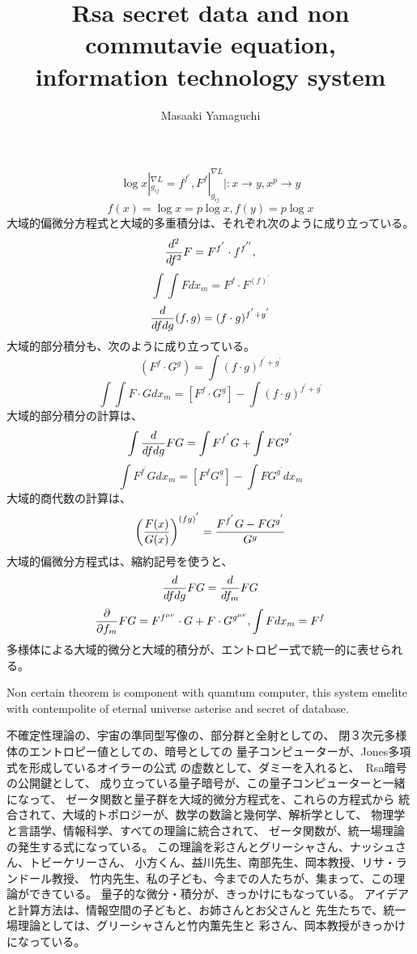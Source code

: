 \documentclass{jsarticle}
\begin{document}
{  $$ \log x|_{g_{ij}}^{\nabla L} = f^{f^{'}}, F^f|_{g_{ij}}^{\nabla L}
  |: x \to y, x^p \to y $$ 
  $$  f(x) = \log x = p \log x, f(y) = p \log x  $$
  大域的偏微分方程式と大域的多重積分は、それぞれ次のように成り立っている。
  $$ {d^2 \over df^2}F = F^{f^{'}}\cdot f^{f^{''}},  $$
  $$ \int \int F dx_m = F^f \cdot F^{(f)^{'}} $$
  $$ {d \over df dg}(f,g) = (f \cdot g)^{f^{'} + g^{'}} $$
  大域的部分積分も、次のように成り立っている。
  $$ (F^f \cdot G^g) = \int (f \cdot g)^{f^{'} + g^{'}} $$
  $$ \int \int F\cdot G dx_m = [F^f \cdot G^g] - 
  \int (f \cdot g)^{f^{'} + g^{'}} $$
  大域的部分積分の計算は、
  $$ \int {d \over {df dg}}FG = \int F^{f^{'}}G + \int F G^{g^{'}} $$
  $$ \int F^{f^{'}}Gdx_m = [F^f G^g] - \int F G^{g^{'}}dx_m$$
  大域的商代数の計算は、
  $$ \left({F(x) \over G(x)}\right)^{(fg)^{'}} = {F^{f^{'}}G - FG^{g^{'}}
  \over G^{g}} $$
  大域的偏微分方程式は、縮約記号を使うと、
  $$ {d \over df dg}FG = {d \over df_m}FG $$
  $$ {\partial \over \partial f_m}FG = F^{f^{\mu\nu}}\cdot G
  + F \cdot G^{g^{\mu\nu}}, \int F dx_m = F^f $$
  多様体による大域的微分と大域的積分が、エントロピー式で統一的に表せられる。

\newpage
\title{Rsa secret data and non commutavie equation, \\
information technology system}
\author{Masaaki Yamaguchi}

      Non certain theorem is component with quamtum computer, this system
   emelite with contempolite of eternal universe asterise and
   secret of database.

   不確定性理論の、宇宙の準同型写像の、部分群と全射としての、
   閉３次元多様体のエントロピー値としての、暗号としての
   量子コンピューターが、Jones多項式を形成しているオイラーの公式
   の虚数として、ダミーを入れると、　Rsa暗号の公開鍵として、
   成り立っている量子暗号が、この量子コンピューターと一緒になって、
   ゼータ関数と量子群を大域的微分方程式を、これらの方程式から
   統合されて、大域的トポロジーが、数学の数論と幾何学、解析学として、
   物理学と言語学、情報科学、すべての理論に統合されて、
   ゼータ関数が、統一場理論の発生する式になっている。
   この理論を彩さんとグリーシャさん、ナッシュさん、トビーケリーさん、
   小方くん、益川先生、南部先生、岡本教授、リサ・ランドール教授、
   竹内先生、私の子ども、今までの人たちが、集まって、この理論ができている。
   量子的な微分・積分が、きっかけにもなっている。
   アイデアと計算方法は、情報空間の子どもと、お姉さんとお父さんと
   先生たちで、統一場理論としては、グリーシャさんと竹内薫先生と
   彩さん、岡本教授がきっかけになっている。


}
\end{document}
